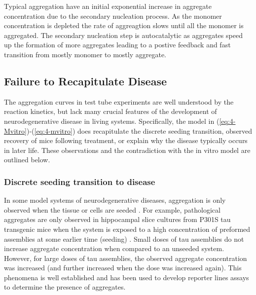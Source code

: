  Typical aggregation have an initial exponential increase in aggregate concentration due to the secondary nucleation process. As the monomer concentration is depleted the rate of aggreagtion slows until all the monomer is aggregated. The secondary nucleation step is autocatalytic as aggregates speed up the formation of more aggregates leading to a postive feedback and fast transition from mostly monomer to mostly aggregate.

\subsection{Failure to Recapitulate Disease}

The aggregation curves in test tube experiments are well understood by the reaction kinetics, but lack many crucial features of the development of neurodegenerative disease in living systems. Specifically, the model in (\ref{eq:4-Mvitro})-(\ref{eq:4-mvitro}) does recapitulate the discrete seeding transition, observed recovery of mice following treatment, or explain why the disease typically occurs in later life. These observations and the contradiction with the in vitro model are outlined below.

\subsubsection{Discrete seeding transition to disease}

In some model systems of neurodegenerative diseases, aggregation is only observed when the tissue or cells are seeded \cite{miller_tau_2021, tuck_cholesterol_2022}. For example, pathological aggregates are only observed in hippocampal slice cultures from P301S tau transgenic mice when the system is exposed to a high concentration of preformed assemblies at some earlier time (seeding) \cite{miller_tau_2021}. Small doses of tau assemblies do not increase aggregate concentration when compared to an unseeded system. However, for large doses of tau assemblies, the observed aggregate concentration was increased (and further increased when the dose was increased again). This phenomena is well established \cite{jucker_propagation_2018} and has been used to develop reporter lines assays to determine the presence of aggregates.

